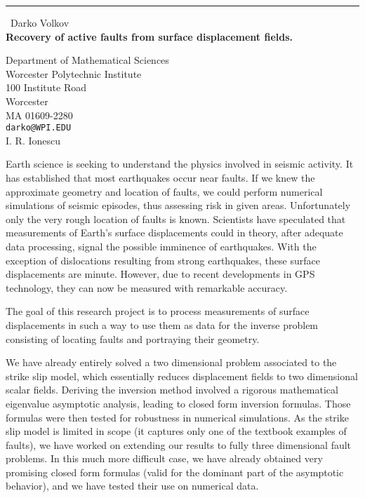 \documentclass{report}
\begin{document}
\begin{center}
\rule{6in}{1pt} \
{\large Darko Volkov \\
{\bf Recovery of active faults from surface displacement fields.}}

Department of Mathematical Sciences \\ Worcester Polytechnic Institute \\ 100 Institute Road \\ Worcester \\ MA 01609-2280
\\
{\tt darko@WPI.EDU}\\
I. R. Ionescu\end{center}

Earth science is seeking to understand the physics involved in seismic
activity. It has established that most earthquakes occur near faults. If
we knew the approximate geometry and location of faults, we could perform
numerical simulations of seismic episodes, thus assessing risk in given
areas. Unfortunately only the very rough location of faults is known.
Scientists have speculated that measurements of Earth's surface
displacements could in theory, after adequate data processing, signal the
possible imminence of earthquakes. With the exception of dislocations
resulting from strong earthquakes, these surface displacements are minute.
However, due to recent developments in GPS technology, they can now be
measured with remarkable accuracy.

The goal of this research project is to process measurements of surface
displacements in such a way to use them as data for the inverse problem
consisting of locating faults and portraying their geometry.

We have already entirely solved a two dimensional problem associated to
the strike slip model, which essentially reduces displacement fields to
two dimensional scalar fields. Deriving the inversion method involved a
rigorous mathematical eigenvalue asymptotic analysis, leading to closed
form inversion formulas. Those formulas were then tested for robustness in
numerical simulations. As the strike slip model is limited in scope (it
captures only one of the textbook examples of faults), we have worked on
extending our results to fully three dimensional fault problems. In this
much more difficult case, we have already obtained very promising closed
form formulas (valid for the dominant part of the asymptotic behavior),
and we have tested their use on numerical data.
\end{document}
